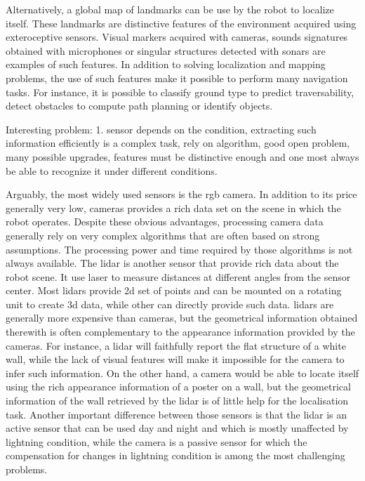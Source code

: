 Alternatively, a global map of landmarks can be use by the robot to localize itself. These landmarks are distinctive features of the environment acquired using exteroceptive sensors. Visual markers acquired with cameras, sounds signatures obtained with microphones or singular structures detected with sonars are examples of such features. In addition to solving localization and mapping problems, the use of such features make it possible to perform many navigation tasks. For instance, it is possible to classify ground type to predict traversability, detect obstacles to compute path planning or identify objects.

Interesting problem: 1. sensor depends on the condition, extracting such information efficiently is a complex task, rely on algorithm, good open problem, many possible upgrades, features must be distinctive enough and one most always be able to recognize it under different conditions. 

Arguably, the most widely used sensors is the \gls*{rgb} camera. In addition to its price generally very low, cameras provides a rich data set on the scene in which the robot operates. Despite these obvious advantages, processing camera data generally rely on very complex algorithms that are often based on strong assumptions. The processing power and time required by those algorithms is not always available. The \gls*{lidar} is another sensor that provide rich data about the robot scene. It use laser to measure distances at different angles from the sensor center. Most \gls*{lidar}s provide \gls*{2d} set of points and can be mounted on a rotating unit to create \gls*{3d} data, while other can directly provide such data. \gls*{lidar}s are generally more expensive than cameras, but the geometrical information obtained therewith is often complementary to the appearance information provided by the cameras. For instance, a \gls*{lidar} will faithfully report the flat structure of a white wall, while the lack of visual features will make it impossible for the camera to infer such information. On the other hand, a camera would be able to locate itself using the rich appearance information of a poster on a wall, but the geometrical information of the wall retrieved by the \gls*{lidar} is of little help for the localisation task. Another important difference between those sensors is that the \gls*{lidar} is an active sensor that can be used day and night and which is mostly unaffected by lightning condition, while the camera is a passive sensor for which the compensation for changes in lightning condition is among the most challenging problems.

